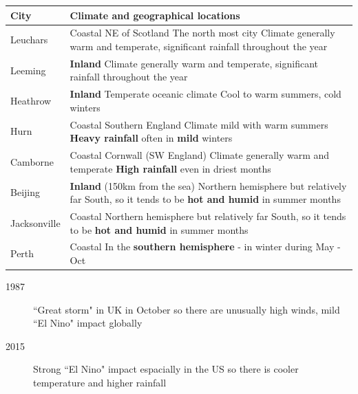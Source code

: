 \documentclass[fleqn, 11pt]{article}
\begin{document}
	\begin{tabular}{|p{2cm}|p{15cm}|}
		\hline
		\textbf{City} & \textbf{Climate and geographical locations} \\
		\hline
		Leuchars & Coastal \newline NE of Scotland \newline The north most city \newline Climate generally warm and temperate, significant rainfall throughout the year\\
		\hline
		Leeming & \textbf{Inland} \newline Climate generally warm and temperate, significant rainfall throughout the year\\
		\hline
		Heathrow  & \textbf{Inland} \newline Temperate oceanic climate \newline Cool to warm summers, cold winters\\
		\hline
		Hurn  & Coastal \newline Southern England \newline Climate mild with warm summers \newline \textbf{Heavy rainfall} often in \textbf{mild} winters\\
		\hline
		Camborne & Coastal \newline Cornwall (SW England) \newline Climate generally warm and temperate \newline \textbf{High rainfall} even in driest months\\
		\hline
		Beijing  & \textbf{Inland} (150km from the sea) \newline Northern hemisphere but relatively far South, so it tends to be \textbf{hot and humid} in summer months\\
		\hline
		Jacksonville  & Coastal \newline Northern hemisphere but relatively far South, so it tends to be \textbf{hot and humid} in summer months \\
		\hline
		Perth & Coastal \newline In the \textbf{southern hemisphere} - in winter during May - Oct\\
		\hline
	\end{tabular}
	
	\begin{description}
		\item[1987] ``Great storm" in UK in October so there are unusually high winds, mild ``El Nino" impact globally
		\item[2015] Strong ``El Nino" impact espacially in the US so there is cooler temperature and higher rainfall
	\end{description}
	
\end{document}

